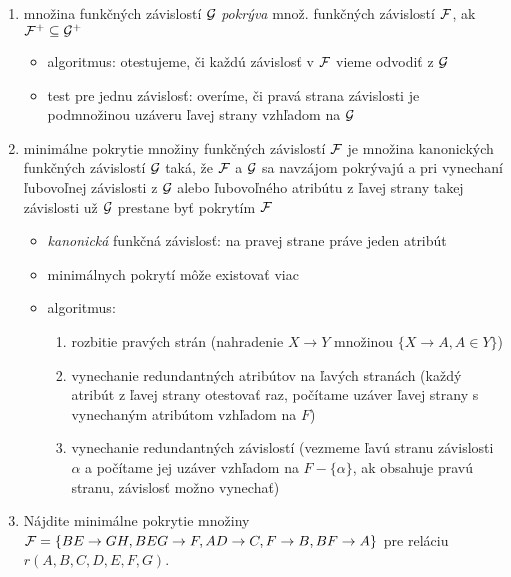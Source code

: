 \documentclass[10pt, a4paper]{article}
\begin{document}
\begin{enumerate}
\item množina funkčných závislostí ${\cal G}$ \emph{pokrýva} množ. funkčných závislostí ${\cal F}$, ak ${\cal F}^+\subseteq {\cal G}^+$
\begin{itemize}
    \item algoritmus: otestujeme, či každú závislosť v ${\cal F}$ vieme odvodiť z ${\cal G}$
    \item test pre jednu závislosť: overíme, či pravá strana závislosti je podmnožinou uzáveru ľavej strany vzhľadom na ${\cal G}$
\end{itemize}

\item minimálne pokrytie množiny funkčných závislostí ${\cal F}$ je množina kanonických funkčných závislostí ${\cal G}$ taká,
    že ${\cal F}$ a ${\cal G}$ sa navzájom pokrývajú a pri vynechaní ľubovoľnej závislosti z ${\cal G}$
    alebo ľubovoľného atribútu z ľavej strany takej závislosti už ${\cal G}$ prestane byť pokrytím ${\cal F}$ 
\begin{itemize}
    \item \emph{kanonická} funkčná závislosť: na pravej strane práve jeden atribút
    \item minimálnych pokrytí môže existovať viac
    \item algoritmus:
        \begin{enumerate}
            \item rozbitie pravých strán (nahradenie $X\to Y$ množinou $\{X\to A, A\in Y\}$)
            \item vynechanie redundantných atribútov na ľavých stranách (každý atribút z ľavej strany otestovať raz, počítame uzáver ľavej strany s vynechaným atribútom vzhľadom na $F$)
            \item vynechanie redundantných závislostí (vezmeme ľavú stranu závislosti $\alpha$ a počítame jej uzáver vzhľadom na $F-\{\alpha\}$, ak obsahuje pravú stranu, závislosť možno vynechať)
        \end{enumerate}
\end{itemize}

\item Nájdite minimálne pokrytie množiny ${\cal F}=\{BE\to GH, BEG\to F, AD\to C, F\to B, BF\to A\}$ pre reláciu $r(A, B, C, D, E, F, G)$.


\end{enumerate}
\end{document}
